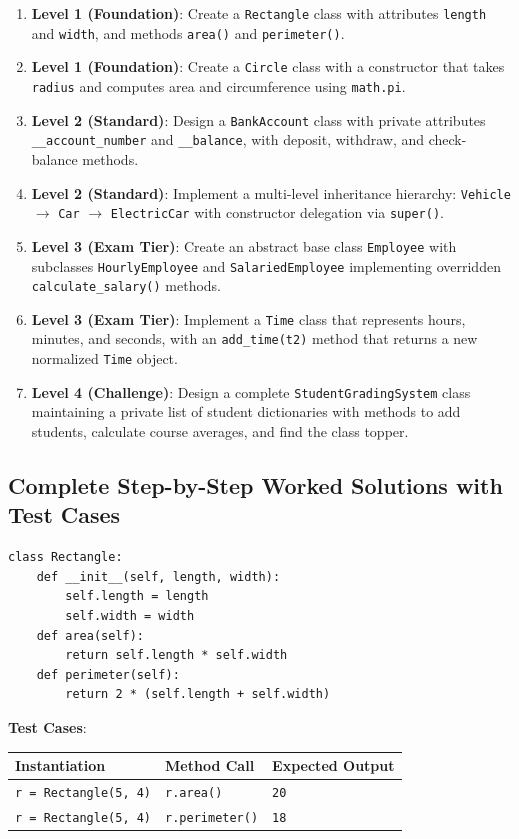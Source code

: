 \begin{practiceset}
\begin{enumerate}[leftmargin=1.5em]
    \item \textbf{Level 1 (Foundation)}: Create a \texttt{Rectangle} class with attributes \texttt{length} and \texttt{width}, and methods \texttt{area()} and \texttt{perimeter()}.
    \item \textbf{Level 1 (Foundation)}: Create a \texttt{Circle} class with a constructor that takes \texttt{radius} and computes area and circumference using \texttt{math.pi}.
    \item \textbf{Level 2 (Standard)}: Design a \texttt{BankAccount} class with private attributes \texttt{\_\_account\_number} and \texttt{\_\_balance}, with deposit, withdraw, and check-balance methods.
    \item \textbf{Level 2 (Standard)}: Implement a multi-level inheritance hierarchy: \texttt{Vehicle} $\to$ \texttt{Car} $\to$ \texttt{ElectricCar} with constructor delegation via \texttt{super()}.
    \item \textbf{Level 3 (Exam Tier)}: Create an abstract base class \texttt{Employee} with subclasses \texttt{HourlyEmployee} and \texttt{SalariedEmployee} implementing overridden \texttt{calculate\_salary()} methods.
    \item \textbf{Level 3 (Exam Tier)}: Implement a \texttt{Time} class that represents hours, minutes, and seconds, with an \texttt{add\_time(t2)} method that returns a new normalized \texttt{Time} object.
    \item \textbf{Level 4 (Challenge)}: Design a complete \texttt{StudentGradingSystem} class maintaining a private list of student dictionaries with methods to add students, calculate course averages, and find the class topper.
\end{enumerate}
\end{practiceset}

\subsection{Complete Step-by-Step Worked Solutions with Test Cases}

\begin{solutionbox}
\begin{lstlisting}[language=Python3]
class Rectangle:
    def __init__(self, length, width):
        self.length = length
        self.width = width
    def area(self):
        return self.length * self.width
    def perimeter(self):
        return 2 * (self.length + self.width)
\end{lstlisting}
\textbf{Test Cases}:
\begin{tabular}{|l|l|l|}
\hline
\textbf{Instantiation} & \textbf{Method Call} & \textbf{Expected Output} \\ \hline
\texttt{r = Rectangle(5, 4)} & \texttt{r.area()} & \texttt{20} \\ \hline
\texttt{r = Rectangle(5, 4)} & \texttt{r.perimeter()} & \texttt{18} \\ \hline
\end{tabular}
\end{solutionbox}

